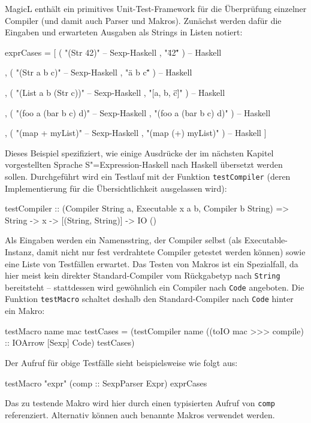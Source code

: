 \documentclass[11pt, a4paper, bibgerm]{scrbook}
\newenvironment{DIFnomarkup}{}{}
\newcommand\icode[1]{\lstinline?#1?}
\newcommand{\sexp}{S"=Expression}
\begin{document}
MagicL enthält ein primitives Unit-Test-Framework für die Überprüfung
einzelner Compiler (und damit auch Parser und Makros). Zunächst werden
dafür die Eingaben und erwarteten Ausgaben als Strings in Listen
notiert:
\begin{DIFnomarkup}\begin{code}
exprCases = [ ( "(Str 42)"                    -- Sexp-Haskell 
                , "\"42\"" )                  -- Haskell 

              , ( "(Str a  b c)"              -- Sexp-Haskell 
                , "\"a b c\"" )               -- Haskell 

              , ( "(List a b (Str c))"        -- Sexp-Haskell 
                , "[a, b, \"c\"]" )           -- Haskell 

              , ( "(foo a (bar b c) d)"       -- Sexp-Haskell 
                , "(foo a (bar b c) d)" )     -- Haskell 

              , ( "(map + myList)"            -- Sexp-Haskell 
                , "(map (+) myList)" )        -- Haskell 
              ]  
\end{code}\end{DIFnomarkup}
Dieses Beispiel spezifiziert, wie einige Ausdrücke der im nächsten
Kapitel vorgestellten Sprache \sexp{}-Haskell nach Haskell übersetzt
werden sollen. Durchgeführt wird ein Testlauf mit der Funktion
\icode{testCompiler} (deren Implementierung für die Übersichtlichkeit
ausgelassen wird):
\begin{DIFnomarkup}\begin{code} 
testCompiler :: 
  (Compiler String a, Executable x a b, Compiler b String) => 
  String -> x -> [(String, String)] -> IO ()
\end{code}\end{DIFnomarkup}
Als Eingaben werden ein Namensstring, der Compiler selbst (als
Executable-Instanz, damit nicht nur fest verdrahtete Compiler getestet
werden können) sowie eine Liste von Testfällen erwartet. Das Testen
von Makros ist ein Spezialfall, da hier meist kein direkter
Standard-Compiler vom Rückgabetyp nach \icode{String} bereitsteht --
stattdessen wird gewöhnlich ein Compiler nach \icode{Code}
angeboten. Die Funktion \icode{testMacro} schaltet deshalb den
Standard-Compiler nach \icode{Code} hinter ein
Makro:
\begin{DIFnomarkup}\begin{code}
testMacro name mac testCases = 
  (testCompiler name 
                ((toIO mac >>> compile) :: IOArrow [Sexp] Code)
                testCases)
\end{code}\end{DIFnomarkup}
Der Aufruf für obige Testfälle sieht beispielsweise wie folgt aus:
\begin{DIFnomarkup}\begin{code}
testMacro "expr" (comp :: SexpParser Expr) exprCases  
\end{code}\end{DIFnomarkup}
Das zu testende Makro wird hier durch einen typisierten Aufruf von
\icode{comp} referenziert. Alternativ können auch benannte Makros
verwendet werden.
\end{document}
